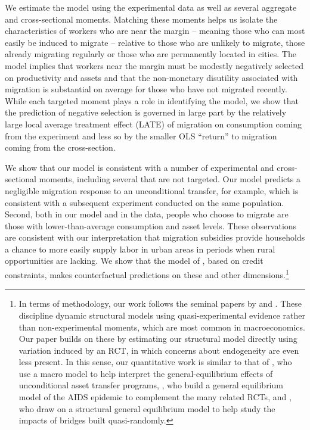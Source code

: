 \documentclass[12pt,pdftex]{article}
\begin{document}
We estimate the model using the experimental data as well as several aggregate and cross-sectional moments. Matching these moments helps us isolate the characteristics of workers who are near the margin -- meaning those who can most easily be induced to migrate -- relative to those who are unlikely to migrate, those already migrating regularly or those who are permanently located in cities. The model implies that workers near the margin must be modestly negatively selected on productivity and assets and that the non-monetary disutility associated with migration is substantial on average for those who have not migrated recently. While each targeted moment plays a role in identifying the model, we show that the prediction of negative selection is governed in large part by the relatively large local average treatment effect (LATE) of migration on consumption coming from the experiment and less so by the smaller OLS ``return'' to migration coming from the cross-section.

We show that our model is consistent with a number of experimental and cross-sectional moments, including several that are not targeted. Our model predicts a negligible migration response to an unconditional transfer, for example, which is consistent with a subsequent experiment conducted on the same population. Second, both in our model and in the data, people who choose to migrate are those with lower-than-average consumption and asset levels. These observations are consistent with our interpretation that migration subsidies provide households a chance to more easily supply labor in urban areas in periods when rural opportunities are lacking. We show that the model of \citet{brch14}, based on credit constraints, makes counterfactual predictions on these and other dimensions.\footnote{In terms of methodology, our work follows the seminal papers by \citet{towo06} and \citet{kato11}. These discipline dynamic structural models using quasi-experimental evidence rather than non-experimental moments, which are most common in macroeconomics. Our paper builds on these by estimating our structural model directly using variation induced by an RCT, in which concerns about endogeneity are even less present. In this sense, our quantitative work is similar to that of \citet{buka14}, who use a macro model to help interpret the general-equilibrium effects of unconditional asset transfer programs, \citet{grki19}, who build a general equilibrium model of the AIDS epidemic to complement the many related RCTs, and \citet{brdo19}, who draw on a structural general equilibrium model to help study the impacts of bridges built quasi-randomly.}
\end{document}
